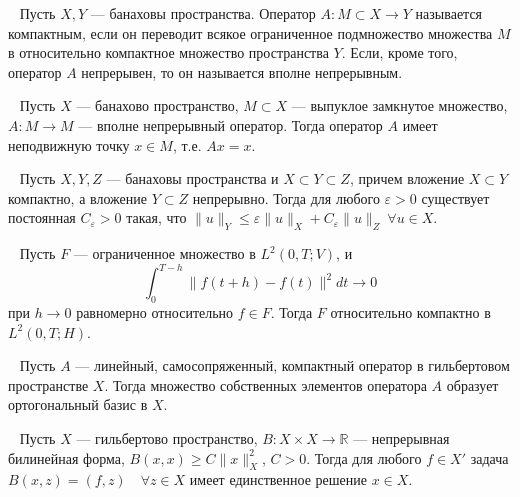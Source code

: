 \begin{definition}
    \label{def:compact_operator}~\cite[с.~190]{Lusternik1982}
    Пусть $X, Y$ — банаховы пространства.
    Оператор $A : M \subset X \to Y$ называется компактным,
    если он переводит всякое ограниченное подмножество множества
    $M$ в относительно компактное множество пространства $Y$.
    Если, кроме того, оператор $A$ непрерывен,
    то он называется вполне непрерывным.
\end{definition}

\begin{theorem}
    \label{thm:schauder}~\cite[с.~193]{Lusternik1982}
    Пусть $X$ — банахово пространство, $M \subset X$ — выпуклое
    замкнутое множество, $A : M \to M$ — вполне непрерывный оператор.
    Тогда оператор $A$ имеет неподвижную точку $x \in M$, т.е. $Ax = x$.
\end{theorem}

\begin{lemma}
    \label{lem:embedding}~\cite[с.~365]{Zeidler1990a}
    Пусть $X, Y, Z$ — банаховы пространства и $X \subset Y \subset Z$,
    причем вложение $X \subset Y$ компактно,
    а вложение $Y \subset Z$ непрерывно.
    Тогда для любого $\varepsilon > 0$ существует постоянная
    $C_\varepsilon > 0$ такая, что
    $\|u\|_Y \leq \varepsilon \|u\|_X
    + C_\varepsilon \|u\|_Z \ \forall u \in X$.
\end{lemma}

\begin{theorem}
    \label{thm:compactness}~\cite[теорема 3]{Simon1986}
    Пусть $F$ — ограниченное множество в $L^2(0, T; V)$, и
    \[
        \int_0^{T-h} \|f(t+h) - f(t)\|^2 dt \to 0
    \]
    при $h \to 0$ равномерно относительно $f \in F$.
    Тогда $F$ относительно компактно в $L^2(0, T; H)$.
\end{theorem}

\begin{theorem}
    \label{thm:hilbert-schmidt}~\cite[с. 263]{Kolmogorov2004}
    Пусть $A$ — линейный, самосопряженный, компактный оператор
    в гильбертовом пространстве $X$.
    Тогда множество собственных элементов оператора $A$ образует
    ортогональный базис в $X$.
\end{theorem}

\begin{theorem}
    \label{thm:lax-milgram}~\cite[с. 40]{Oben1977}
    Пусть $X$ — гильбертово пространство,
    $B : X \times X \to \mathbb{R}$ — непрерывная билинейная форма,
    $B(x, x) \geq C\|x\|^2_X$, $C > 0$.
    Тогда для любого $f \in X'$ задача
    $B(x, z) = (f, z) \quad \forall z \in X$
    имеет единственное решение $x \in X$.
\end{theorem}

